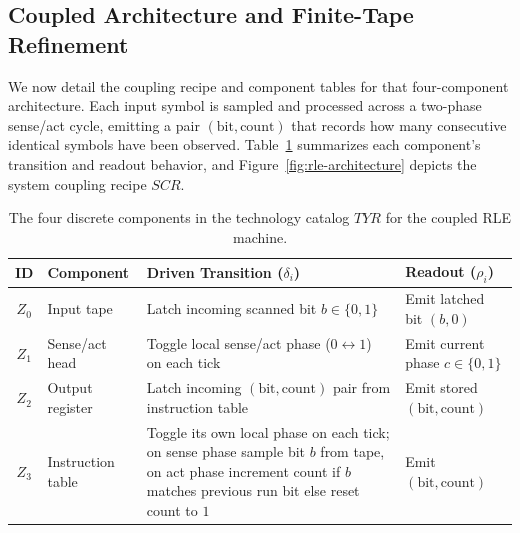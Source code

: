\subsection{Coupled Architecture and Finite-Tape Refinement}
\label{sec:case-machine}

We now detail the coupling recipe and component tables for that four-component architecture. Each input symbol is sampled and processed across a two-phase sense/act cycle, emitting a pair $(\text{bit},\text{count})$ that records how many consecutive identical symbols have been observed. Table~\ref{tab:rle-components} summarizes each component's transition and readout behavior, and Figure~\ref{fig:rle-architecture} depicts the system coupling recipe $SCR$.

\begin{table}[t]
\caption{The four discrete components in the technology catalog $TYR$ for the coupled RLE machine.}
\label{tab:rle-components}
\renewcommand{\arraystretch}{1.25}
\footnotesize
\begin{tabularx}{\textwidth}{@{}c l X l@{}}
\toprule
\textbf{ID} & \textbf{Component} & \textbf{Driven Transition ($\delta_i$)} & \textbf{Readout ($\rho_i$)} \\
\midrule
$Z_0$ & Input tape & Latch incoming scanned bit $b\in\{0,1\}$ & Emit latched bit $(b,0)$ \\
$Z_1$ & Sense/act head & Toggle local sense/act phase ($0\leftrightarrow 1$) on each tick & Emit current phase $c\in\{0,1\}$ \\
$Z_2$ & Output register & Latch incoming $(\text{bit},\text{count})$ pair from instruction table & Emit stored $(\text{bit},\text{count})$ \\
$Z_3$ & Instruction table & Toggle its own local phase on each tick; on sense phase sample bit $b$ from tape, on act phase increment count if $b$ matches previous run bit else reset count to $1$ & Emit $(\text{bit},\text{count})$ \\
\bottomrule
\end{tabularx}
\end{table}

